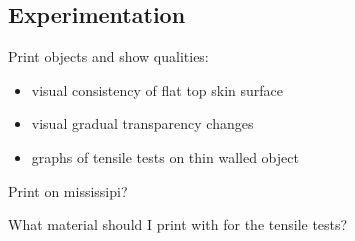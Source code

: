 \subsection{Experimentation}
Print objects and show qualities:
\begin{itemize}
\item visual consistency of flat top skin surface
\item visual gradual transparency changes
\item graphs of tensile tests on thin walled object
\end{itemize}

Print on mississipi?

What material should I print with for the tensile tests?









